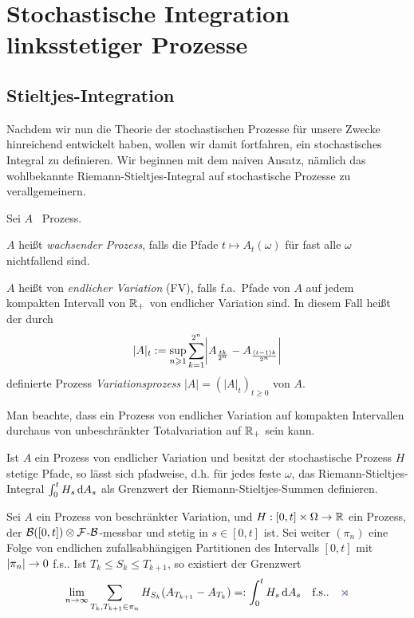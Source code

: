 \chapter{Stochastische Integration linksstetiger Prozesse}
\label{c:stoch-int}

\section{Stieltjes-Integration}

Nachdem wir nun die Theorie der stochastischen Prozesse für unsere Zwecke
hinreichend entwickelt haben, wollen wir damit fortfahren, ein stochastisches
Integral zu definieren.
Wir beginnen mit dem naiven Ansatz, nämlich das wohlbekannte
Riemann-Stieltjes-Integral auf stochastische Prozesse zu verallgemeinern.

\begin{defn}
\label{defn:2.1}
Sei $A$ \cadlag\ Prozess.
\begin{defnenum}
\item 
$A$ heißt \emph{wachsender Prozess}, falls die Pfade $t\mapsto A_t(\omega)$ für
fast alle $\omega$ nichtfallend sind.
\item 
$A$ heißt von \emph{endlicher Variation} (FV), falls f.a.\ Pfade von $A$ auf
jedem kompakten Intervall von $\mathbb{R}_+$ von endlicher Variation sind. In diesem
Fall heißt der durch
\begin{align*}
\lvert A\rvert_t := \sup_{n\geqslant 1} \sum_{k=1}^{2^n} 
\biggl|A_{\frac{tk}{2^n}} 
- A_{\frac{(t-1)k}{2^n}}\biggr|
\end{align*}
definierte Prozess \emph{Variationsprozess} $|A|=(|A|_t)_{t\ge 0}$ von
$A$.\fish 
\end{defnenum}


\end{defn}

Man beachte, dass ein Prozess von endlicher Variation auf kompakten Intervallen
durchaus von unbeschränkter Totalvariation auf $\mathbb{R}_+$ sein kann.

Ist $A$ ein Prozess von endlicher Variation und besitzt der stochastische
Prozess $H$ stetige Pfade, so lässt sich pfadweise, d.h. für jedes feste
$\omega$, das Riemann-Stieltjes-Integral $\int_0^t H_s\,\mathrm{d} A_s$  als Grenzwert
der Riemann-Stieltjes-Summen definieren. 
\begin{prop}
\label{prop:2.1}
Sei $A$ ein Prozess von beschränkter Variation, und $H:[0,t]
\times \Omega \to \mathbb{R}$ ein Prozess, der $\mathcal{B}([0,t]) \otimes \mathcal{F}$-$\mathcal{B}$-messbar
und stetig in $s\in [0,t]$ ist. Sei weiter $(\pi_n)$ eine Folge von endlichen
zufallsabhängigen Partitionen des Intervalls $[0,t]$ mit $\lvert\pi_n\rvert \to 0$
f.s.. Ist $T_k \le S_k \le T_{k+1}$, so existiert der Grenzwert
\begin{align*}
\lim_{n\to\infty} \sum_{T_k,T_{k+1} \in \pi_n} H_{S_k}(A_{T_{k+1}}-A_{T_k})
\defr \int_0^t H_s\,\dA_s \quad \text{f.s.}.\fish
\end{align*}
\end{prop}

